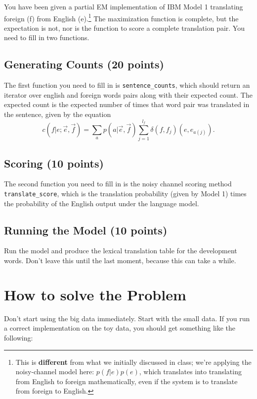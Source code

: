 \documentclass[11pt]{article}
\begin{document}
You have been given a partial EM implementation of IBM Model 1 translating foreign (f) from English (e).\footnote{This is {\bf different} from what we initially discussed in class; we're applying the noisy-channel model here: $p(f|e) p(e)$, which translates into translating from English to foreign mathematically, even if the system is to translate from foreign to English.}  The maximization function is complete, but the expectation is not, nor is the function to score a complete translation pair.  You need to fill in two functions.

\subsection*{Generating Counts (20 points)}

The first function you need to fill in is \texttt{sentence\_counts}, which should return an iterator over english and foreign words pairs along with their expected count.  The expected count is the expected number of times that word pair was translated in the sentence, given by the equation
\begin{equation}
c(f|e;\vec{e}, \vec{f}) = \sum_{a} p(a|\vec{e}, \vec{f}) \sum_{j=1}^{l_f} \delta(f, f_j)(e, e_{a(j)}).
\end{equation}

\subsection*{Scoring (10 points)}

The second function you need to fill in is the noisy channel scoring method \texttt{translate\_score}, which is the translation probability (given by Model 1) times the probability of the English output under the language model.

\subsection*{Running the Model (10 points)}

Run the model and produce the lexical translation table for the development words.  Don't leave this until the last moment, because this can take a while.

\section*{How to solve the Problem}

Don't start using the big data immediately.  Start with the small data.  If you run a correct implementation on the toy data, you should get something like the following:
\end{document}
